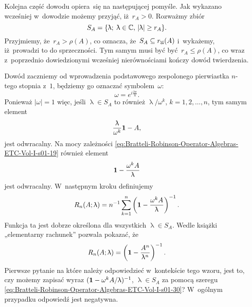 \documentclass[a4paper,11pt]{article}
\numberwithin{equation}{section}
\renewcommand{\lambda}{\uplambda}
\begin{document}
Kolejna część dowodu opiera~się na następującej pomyśle. Jak wykazano
wcześniej w~dowodzie możemy przyjąć, iż~$r_{ A } > 0$. Rozważmy zbiór
\begin{equation}
  \label{eq:Bratteli-Robinson-Operator-Algebras-ETC-Vol-I-s01-46}
  S_{ A } =
  \{ \lambda; \; \lambda \in \Cbb, \, | \lambda | \geq r_{ A } \}.
\end{equation}
Przyjmiemy, że~$r_{ A } > \rho( A )$, co oznacza, że~$S_{ A } \subseteq r_{ \mathfrak{U} }( A )$
i~wykażemy, iż~prowadzi to do sprzeczności. Tym samym musi być
być~$r_{ A } \leq \rho( A )$, co wraz z~poprzednio dowiedzionymi wcześniej
nierównościami kończy dowód twierdzenia.

Dowód zaczniemy od wprowadzenia podstawowego zespolonego pierwiastka
$n$-tego stopnia z~$1$, będziemy go oznaczać symbolem~$\omega$:
\begin{equation}
  \label{eq:Bratteli-Robinson-Operator-Algebras-ETC-Vol-I-s01-47}
  \omega = e^{ i \frac{ 2 \pi }{ n } }.
\end{equation}
Ponieważ $| \omega | = 1$ więc, jeśli $\lambda \in S_{ A }$ to również
$\lambda / \omega^{ k }$, $k = 1, 2, \ldots, n$, tym samym element
\begin{equation}
  \label{eq:Bratteli-Robinson-Operator-Algebras-ETC-Vol-I-s01-48}
  \frac{ \lambda }{ \omega^{ k } } \UnitAlg - A,
\end{equation}
jest odwracalny. Na mocy zależności
\eqref{eq:Bratteli-Robinson-Operator-Algebras-ETC-Vol-I-s01-19} również
element
\begin{equation}
  \label{eq:Bratteli-Robinson-Operator-Algebras-ETC-Vol-I-s01-49}
  \UnitAlg - \frac{ \omega^{ k } A }{ \lambda }
\end{equation}
jest odwracalny. W~następnym kroku definiujemy
\begin{equation}
  \label{eq:Bratteli-Robinson-Operator-Algebras-ETC-Vol-I-s01-50}
  R_{ n }( A; \lambda ) =
  n^{ -1 } \sum_{ k = 1 }^{ n } \left( \UnitAlg -
    \frac{ \omega^{ k } A }{ \lambda } \right)^{ -1 }.
\end{equation}
Funkcja ta jest dobrze określona dla wszystkich $\lambda \in S_{ A }$. Wedle książki
„elementarny rachunek” pozwala pokazać, że
\begin{equation}
  \label{eq:Bratteli-Robinson-Operator-Algebras-ETC-Vol-I-s01-51}
  R_{ n }( A; \lambda ) =
  \left( \UnitAlg - \frac{ A^{ n } }{ \lambda^{ n } } \right)^{ -1 }.
\end{equation}
Pierwsze pytanie na które należy odpowiedzieć w~kontekście tego wzoru, jest
to, czy możemy zapisać wyraz $( \UnitAlg - \omega^{ k } A / \lambda )^{ -1 }$,
$\lambda \in S_{ A }$ za pomocą szeregu
\eqref{eq:Bratteli-Robinson-Operator-Algebras-ETC-Vol-I-s01-30}?
W~ogólnym przypadku odpowiedź jest negatywna.
\end{document}
